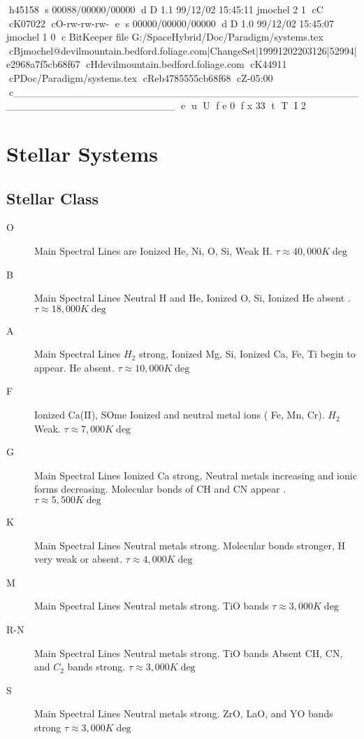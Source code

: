 h45158
s 00088/00000/00000
d D 1.1 99/12/02 15:45:11 jmochel 2 1
cC
cK07022
cO-rw-rw-rw-
e
s 00000/00000/00000
d D 1.0 99/12/02 15:45:07 jmochel 1 0
c BitKeeper file G:/SpaceHybrid/Doc/Paradigm/systems.tex
cBjmochel@devilmountain.bedford.foliage.com|ChangeSet|19991202203126|52994|e2968a7f5cb68f67
cHdevilmountain.bedford.foliage.com
cK44911
cPDoc/Paradigm/systems.tex
cReb4785555cb68f68
cZ-05:00
c______________________________________________________________________
e
u
U
f e 0
f x 33
t
T
I 2
\chapter{Stellar Systems}

\section{Stellar Class}

\begin{description}
	\item[O]
        Main Spectral Lines are Ionized He, Ni, O, Si, Weak H.
        \( \tau \approx 40,000 K \deg \)

	\item[B]
        Main Spectral Lines Neutral H and He, Ionized O, Si, Ionized 
	He absent .
        \( \tau \approx 18,000 K \deg \)

	\item[A]
        Main Spectral Lines \(H_2\) strong, Ionized Mg, Si, Ionized 
	Ca, Fe, Ti begin to appear. He absent.
        \( \tau \approx 10,000 K \deg \)

	\item[F]
        Ionized Ca(II), SOme Ionized and neutral metal ions ( Fe, Mn, 
	Cr). \(H_2\) Weak.
        \( \tau \approx 7,000 K \deg \)

	\item[G]
        Main Spectral Lines Ionized Ca strong, Neutral metals 
	increasing and ionic forms decreasing. Molecular bonds of CH 
	and CN appear .
        \( \tau \approx 5,500 K \deg \)

	\item[K]
        Main Spectral Lines Neutral metals strong. Molecular bonds 
	stronger, H very weak or absent.
        \( \tau \approx 4,000 K \deg \)

	\item[M]
        Main Spectral Lines Neutral metals strong. TiO bands 
        \( \tau \approx 3,000 K \deg \)

	\item[R-N]
        Main Spectral Lines Neutral metals strong. TiO bands Absent
        CH, CN, and \( C_2 \) bands strong.
        \( \tau \approx 3,000 K \deg \)
	
	\item[S]
        Main Spectral Lines Neutral metals strong. 
        ZrO, LaO, and YO bands strong
        \( \tau \approx 3,000 K \deg \)

\end{description}

